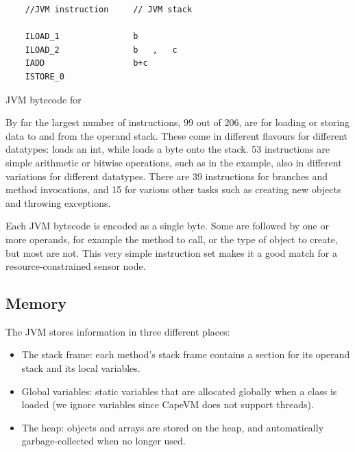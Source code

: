 \begin{listing}
    \centering
    \begin{verbatim}
    //JVM instruction     // JVM stack

    ILOAD_1               b
    ILOAD_2               b   ,   c
    IADD                  b+c
    ISTORE_0
    \end{verbatim}
\caption{JVM bytecode for }
\label{lst-basic-jvm-bytecode-example}
\end{listing}

By far the largest number of instructions, 99 out of 206, are for loading or storing data to and from the operand stack. These come in different flavours for different datatypes:  loads an int, while  loads a byte onto the stack. 53 instructions are simple arithmetic or bitwise operations, such as  in the example, also in different variations for different datatypes. There are 39 instructions for branches and method invocations, and 15 for various other tasks such as creating new objects and throwing exceptions.

Each JVM bytecode is encoded as a single byte. Some are followed by one or more operands, for example the method to call, or the type of object to create, but most are not. This very simple instruction set makes it a good match for a resource-constrained sensor node.

\subsection{Memory}
\label{sec-background-jvm-memory}
The JVM stores information in three different places:
\begin{itemize}
    \item The stack frame: each method's stack frame contains a section for its operand stack and its local variables.
    \item Global variables: static variables that are allocated globally when a class is loaded (we ignore  variables since CapeVM does not support threads).
    \item The heap: objects and arrays are stored on the heap, and automatically garbage-collected when no longer used.
\end{itemize}

